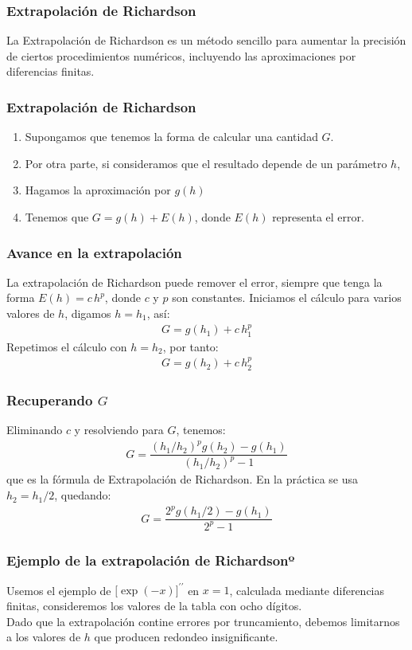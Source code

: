 \documentclass[12pt]{beamer}
\begin{document}
\begin{frame}
\frametitle{Extrapolación de Richardson}
La Extrapolación de Richardson es un método sencillo para aumentar la precisión de ciertos procedimientos numéricos, incluyendo las aproximaciones por diferencias finitas.
\end{frame}
\begin{frame}
\frametitle{Extrapolación de Richardson}
\begin{enumerate}[<+->]
\item Supongamos que tenemos la forma de calcular una cantidad $G$.
\item Por otra parte, si consideramos que el resultado depende de un parámetro $h$,
\item Hagamos la aproximación por $g (h)$
\item Tenemos que $G = g (h) + E (h)$, donde $E (h)$ representa el error.
\end{enumerate}
\end{frame}
\begin{frame}
\frametitle{Avance en la extrapolación}
La extrapolación de Richardson puede remover el error, siempre que tenga la forma $E (h) = c \, h^{p}$, donde $c$ y $p$ son constantes. \pause Iniciamos el cálculo para varios valores de $h$, digamos $h = h_{1}$, así:
\pause
\begin{align*}
G = g (h_{1}) + c \, h_{1}^{p}
\end{align*}
\pause
Repetimos el cálculo con $h = h_{2}$, por tanto:
\pause
\begin{align*}
G = g (h_{2}) + c \, h_{2}^{p}
\end{align*}
\end{frame}
\begin{frame}
\frametitle{Recuperando $G$}
Eliminando $c$ y resolviendo para $G$, tenemos:
\pause
\begin{align*}
G = \dfrac{(h_{1}/h_{2})^{p} g(h_{2}) - g(h_{1})}{(h_{1}/h_{2})^{p}-1}
\end{align*}
que es la fórmula de Extrapolación de Richardson. En la práctica se usa $h_{2} = h_{1}/2$, quedando:
\pause
\begin{align*}
G = \dfrac{2^{p} g(h_{1}/2) - g(h_{1})}{2^{p}-1}
\end{align*}
\end{frame}
\begin{frame}
\frametitle{Ejemplo de la extrapolación de Richardsonº}
Usemos el ejemplo de $\big[ \exp(-x) \big]^{\prime \prime}$ en $x = 1$, calculada mediante diferencias finitas, consideremos los valores de la tabla con ocho dígitos.
\\
\bigskip
\pause
Dado que la extrapolación contine errores por truncamiento, debemos limitarnos a los valores de $h$ que producen redondeo insignificante.
\end{frame}
\end{document}
